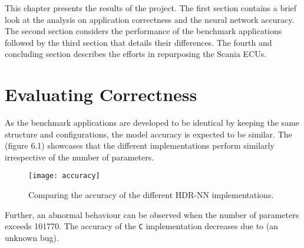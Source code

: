 This chapter presents the results of the project. The first section contains a brief look at the analysis on application correctness and the neural network accuracy. The second section considers the performance of the benchmark applications followed by the third section that details their differences. The fourth and concluding section describes the efforts in repurposing the Scania ECUs.



\section{Evaluating Correctness}


As the benchmark applications are developed to be identical by keeping the same structure and configurations, the model accuracy is expected to be similar. The (figure 6.1) showcases that the different implementations perform similarly irrespective of the number of parameters.

\begin{figure}[!ht]
	\centering
	\texttt{[image: accuracy]}
	\caption[HDR-NN Accuracy]{Comparing the accuracy of the different HDR-NN implementations.}
\end{figure}

Further, an abnormal behaviour can be observed when the number of parameters exceeds 101770. The accuracy of the \texttt{C} implementation decreases due to (an unknown bug).


